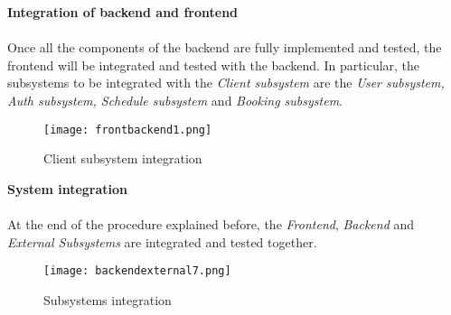 \noindent
\textbf{Integration of backend and frontend}\\ \\
Once all the components of the backend are fully implemented and tested, the frontend will be integrated and tested with the backend. In particular, the subsystems to be integrated with the \textit{Client subsystem} are the \textit{User subsystem, Auth subsystem, Schedule subsystem} and \textit{Booking subsystem}.
\newpage
\begin{figure}[h!]
	\centering
	\texttt{[image: frontbackend1.png]}
	\caption{Client subsystem integration}
\end{figure}

\noindent
\textbf{System integration}\\ \\
At the end of the procedure explained before, the \textit{Frontend}, \textit{Backend} and \textit{External Subsystems} are integrated and tested together.
\begin{figure}[h!]
	\centering
	\texttt{[image: backendexternal7.png]}
	\caption{Subsystems integration}
\end{figure}